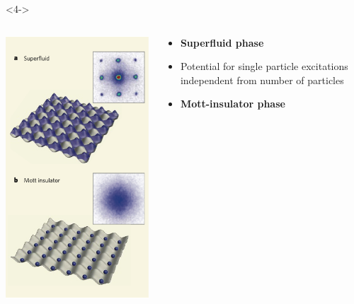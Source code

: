 \documentclass[aspectratio=169]{beamer}
\begin{document}
\begin{frame}
\begin{onlyenv}
\begin{columns}[T]
\begin{column}{.48\textwidth}
      \end{column}%
    \end{columns}
  \end{onlyenv}
  \begin{onlyenv}<4->
    \begin{columns}[T] %
      \begin{column}{.48\textwidth}
        \begin{center}
          \includegraphics[scale=0.2]{../img/SF-MI.png}
        \end{center}
      \end{column}%
      \hfill%
      \begin{column}{.48\textwidth}
        \begin{itemize}
          \item<4-> \textbf{Superfluid phase}\footnotemark[1]
          \item<4-> Potential for single particle excitations independent from number of particles
          \item<4-> \textbf{Mott-insulator phase}\footnotemark[1]

\end{itemize}
\end{column}
\end{columns}
\end{onlyenv}
\end{frame}
\end{document}
